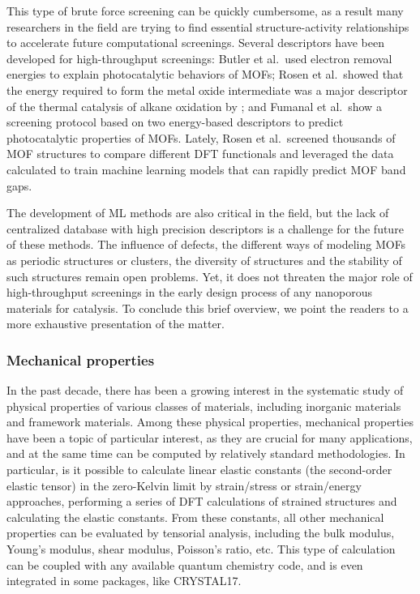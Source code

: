 \documentclass[main.tex]{subfiles}
\begin{document}
This type of brute force screening can be quickly cumbersome, as a result many researchers in the field are trying to find essential structure-activity relationships to accelerate future computational screenings.
Several descriptors have been developed for high-throughput screenings: Butler et al.\ used electron removal energies to explain photocatalytic behaviors of MOFs;\autocite{Butler_2014} Rosen et al.\ showed that the energy required to form the metal oxide intermediate was a major descriptor of the thermal catalysis of alkane oxidation by ;\autocite{Rosen_HTPDFT_2019} and Fumanal et al.\ show a screening protocol based on two energy-based descriptors to predict photocatalytic properties of MOFs.\autocite{Fumanal_descriptor_2020} {Lately, Rosen et al.\ screened thousands of MOF structures to compare different DFT functionals and leveraged the data calculated to train machine learning models that can rapidly predict MOF band gaps.\autocite{Rosen_2022_high} }

The development of ML methods are also critical in the field,\autocite{Rosen_2021} but the lack of centralized database with high precision descriptors is a challenge for the future of these methods. The influence of defects, the different ways of modeling MOFs as periodic structures or clusters, the diversity of structures and the stability of such structures remain open problems. Yet, it does not threaten the major role of high-throughput screenings in the early design process of any nanoporous materials for catalysis. To conclude this brief overview, we point the readers to a more exhaustive presentation of the matter.\autocite{Rosen_2022}

\subsubsection{Mechanical properties}

In the past decade, there has been a growing interest in the systematic study of physical properties of various classes of materials, including inorganic materials and framework materials. Among these physical properties, mechanical properties have been a topic of particular interest, as they are crucial for many applications, and at the same time can be computed by relatively standard methodologies. In particular, is it possible to calculate linear elastic constants (the second-order elastic tensor) in the zero-Kelvin limit by strain/stress or strain/energy approaches, performing a series of DFT calculations of strained structures and calculating the elastic constants. From these constants, all other mechanical properties can be evaluated by tensorial analysis,\autocite{Marmier_2010} including the bulk modulus, Young's modulus, shear modulus, Poisson's ratio, etc. This type of calculation can be coupled with any available quantum chemistry code,\autocite{Golesorkhtabar_2013} and is even integrated in some packages, like CRYSTAL17.\autocite{Dovesi_2018}
\end{document}
